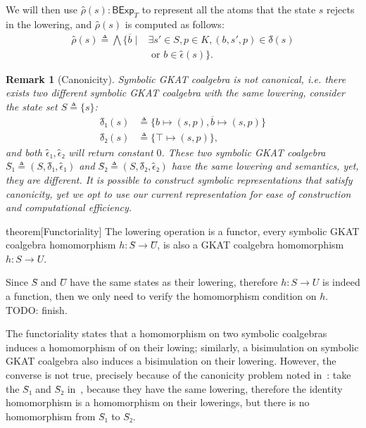 \documentclass[conference]{IEEEtran}
\newtheorem{remark}[definition]{Remark}
\newcommand{\theoryOf}[1]{\ensuremath{\mathsf{#1}}}
\newcommand{\BExp}{\theoryOf{BExp}}
\begin{document}
We will then use \(ρ̂(s): \BExp_T\) to represent all the atoms that the state \(s\) rejects in the lowering, and \(ρ̂(s)\) is computed as follows:
\begin{align*}
    ρ̂(s) ≜ ⋀ \{\overline{b} ∣{}
        & ∃ s' ∈ S, p ∈ K, (b, s', p) ∈ δ̂(s) \\
        & \text{ or } b ∈ ϵ̂(s)\}.
\end{align*}

\begin{remark}[Canonicity]\label{rem:canonicity}
    Symbolic GKAT coalgebra is not canonical, i.e. there exists two different symbolic GKAT coalgebra with the same lowering, consider the state set \(S ≜ \{s\}\):
    \begin{align*}
        {δ̂}₁(s) & ≜ \{b ↦ (s, p), \overline{b} ↦ (s, p)\} \\
        {δ̂}₂(s) & ≜ \{⊤ ↦ (s, p)\},
    \end{align*} 
    and both \(ϵ̂₁, ϵ̂₂\) will return constant \(0\).
    These two symbolic GKAT coalgebra \(Ŝ₁ ≜ (S, δ̂₁, ϵ̂₁)\) and \(Ŝ₂ ≜ (S, δ̂₂, ϵ̂₂)\) have the same lowering and semantics, yet, they are different.
    It is possible to construct symbolic representations that satisfy canonicity, yet we opt to use our current representation for ease of construction and computational efficiency.
\end{remark}

\begin{theoremEnd}{theorem}[Functoriality]\label{thm:lowering-functor}
    The lowering operation is a functor, every symbolic GKAT coalgebra homomorphism \(h: Ŝ → Û\), is also a GKAT coalgebra homomorphism \(h: S → U\).
\end{theoremEnd}

\begin{proofEnd}
    Since \(Ŝ\) and \(Û\) have the same states as their lowering, therefore \(h: S → U\) is indeed a function, then we only need to verify the homomorphism condition on \(h\).
    TODO: finish.
\end{proofEnd}

The functoriality states that a homomorphism on two symbolic coalgebras induces a homomorphism of on their lowing; similarly, a bisimulation on symbolic GKAT coalgebra also induces a bisimulation on their lowering.
However, the converse is not true, precisely because of the canonicity problem noted in~: take the \(Ŝ₁\) and \(Ŝ₂\) in~, because they have the same lowering, therefore the identity homomorphism is a homomorphism on their lowerings, but there is no homomorphism from \(Ŝ₁\) to \(Ŝ₂\).
\end{document}
